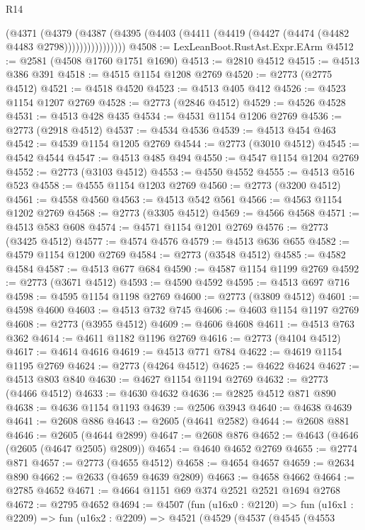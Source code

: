 \begin{lexlean}{R14}
\begin{coremodule}
                (@4371
                  (@4379
                    (@4387
                      (@4395 (@4403 (@4411 (@4419 (@4427 (@4474 (@4482 @4483 @2798))))))))))))))))
@4508 := LexLeanBoot.RustAst.Expr.EArm
@4512 := @2581 (@4508 @1760 @1751 @1690)
@4513 := @2810 @4512
@4515 := @4513 @386 @391
@4518 := @4515 @1154 @1208 @2769
@4520 := @2773 (@2775 @4512)
@4521 := @4518 @4520
@4523 := @4513 @405 @412
@4526 := @4523 @1154 @1207 @2769
@4528 := @2773 (@2846 @4512)
@4529 := @4526 @4528
@4531 := @4513 @428 @435
@4534 := @4531 @1154 @1206 @2769
@4536 := @2773 (@2918 @4512)
@4537 := @4534 @4536
@4539 := @4513 @454 @463
@4542 := @4539 @1154 @1205 @2769
@4544 := @2773 (@3010 @4512)
@4545 := @4542 @4544
@4547 := @4513 @485 @494
@4550 := @4547 @1154 @1204 @2769
@4552 := @2773 (@3103 @4512)
@4553 := @4550 @4552
@4555 := @4513 @516 @523
@4558 := @4555 @1154 @1203 @2769
@4560 := @2773 (@3200 @4512)
@4561 := @4558 @4560
@4563 := @4513 @542 @561
@4566 := @4563 @1154 @1202 @2769
@4568 := @2773 (@3305 @4512)
@4569 := @4566 @4568
@4571 := @4513 @583 @608
@4574 := @4571 @1154 @1201 @2769
@4576 := @2773 (@3425 @4512)
@4577 := @4574 @4576
@4579 := @4513 @636 @655
@4582 := @4579 @1154 @1200 @2769
@4584 := @2773 (@3548 @4512)
@4585 := @4582 @4584
@4587 := @4513 @677 @684
@4590 := @4587 @1154 @1199 @2769
@4592 := @2773 (@3671 @4512)
@4593 := @4590 @4592
@4595 := @4513 @697 @716
@4598 := @4595 @1154 @1198 @2769
@4600 := @2773 (@3809 @4512)
@4601 := @4598 @4600
@4603 := @4513 @732 @745
@4606 := @4603 @1154 @1197 @2769
@4608 := @2773 (@3955 @4512)
@4609 := @4606 @4608
@4611 := @4513 @763 @362
@4614 := @4611 @1182 @1196 @2769
@4616 := @2773 (@4104 @4512)
@4617 := @4614 @4616
@4619 := @4513 @771 @784
@4622 := @4619 @1154 @1195 @2769
@4624 := @2773 (@4264 @4512)
@4625 := @4622 @4624
@4627 := @4513 @803 @840
@4630 := @4627 @1154 @1194 @2769
@4632 := @2773 (@4466 @4512)
@4633 := @4630 @4632
@4636 := @2825 @4512 @871 @890
@4638 := @4636 @1154 @1193
@4639 := @2506 @3943
@4640 := @4638 @4639
@4641 := @2608 @886
@4643 := @2605 (@4641 @2582)
@4644 := @2608 @881
@4646 := @2605 (@4644 @2899)
@4647 := @2608 @876
@4652 := @4643 (@4646 (@2605 (@4647 @2505) @2809))
@4654 := @4640 @4652 @2769
@4655 := @2774 @871
@4657 := @2773 (@4655 @4512)
@4658 := @4654 @4657
@4659 := @2634 @890
@4662 := @2633 (@4659 @4639 @2809)
@4663 := @4658 @4662
@4664 := @2785 @4652
@4671 := @4664 @1151 @69 @374 @2521 @2521 @1694 @2768
@4672 := @2795 @4652
@4694 := @4507
    (fun (u16x0 : @2120) =>
    fun (u16x1 : @2209) =>
    fun (u16x2 : @2209) =>
    @4521
      (@4529
        (@4537
          (@4545
            (@4553

\end{coremodule}
\end{lexlean}
